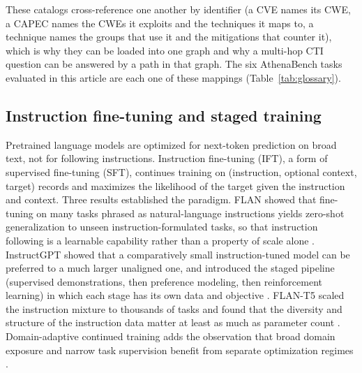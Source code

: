 \documentclass[twocolumn]{svjour3}
\begin{document}
These catalogs cross-reference one another by identifier (a CVE names its CWE, a CAPEC names the CWEs it exploits and the techniques it maps to, a technique names the groups that use it and the mitigations that counter it), which is why they can be loaded into one graph and why a multi-hop CTI question can be answered by a path in that graph. The six AthenaBench tasks evaluated in this article are each one of these mappings (Table~\ref{tab:glossary}).

\subsection{Instruction fine-tuning and staged training}\label{sec:bg-ift}
Pretrained language models are optimized for next-token prediction on broad text, not for following instructions. Instruction fine-tuning (IFT), a form of supervised fine-tuning (SFT), continues training on (instruction, optional context, target) records and maximizes the likelihood of the target given the instruction and context. Three results established the paradigm. FLAN showed that fine-tuning on many tasks phrased as natural-language instructions yields zero-shot generalization to unseen instruction-formulated tasks, so that instruction following is a learnable capability rather than a property of scale alone \cite{wei2022flan}. InstructGPT showed that a comparatively small instruction-tuned model can be preferred to a much larger unaligned one, and introduced the staged pipeline (supervised demonstrations, then preference modeling, then reinforcement learning) in which each stage has its own data and objective \cite{ouyang2022instructgpt}. FLAN-T5 scaled the instruction mixture to thousands of tasks and found that the diversity and structure of the instruction data matter at least as much as parameter count \cite{chung2024flant5}. Domain-adaptive continued training adds the observation that broad domain exposure and narrow task supervision benefit from separate optimization regimes \cite{gururangan2020dontstop}.
\end{document}
